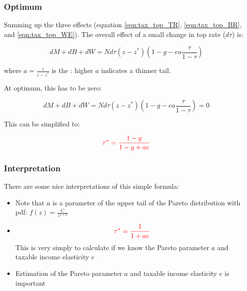         \subsubsection{Optimum}

            Summing up the three effects (equation \ref{eqn:tax_top_TR}, \ref{eqn:tax_top_BR}, and \ref{eqn:tax_top_WE}). The overall effect of a small change in top rate ($d\tau$) is:
    
            \begin{equation*}
                dM + dB + dW = Nd\tau (z-z^*) \left( 1-g-ea \frac{\tau}{1-\tau} \right)
            \end{equation*}
    
            where $a= \frac{z}{z-z^*}$ is the : higher $a$ indicates a thinner tail.
    
            At optimum, this has to be zero:
    
            \begin{equation*}
                dM + dB + dW = Nd\tau (z-z^*) \left( 1-g-ea \frac{\tau}{1-\tau} \right) = 0
            \end{equation*}
    
            This can be simplified to:
    
            \begin{equation}
                \color{red}
                \tau^* = \frac{1-g}{1-g+ae}
            \end{equation}

        \subsubsection{Interpretation}

            There are some nice interpretations of this simple formula:
            \begin{itemize}
                \item Note that $a$ is a parameter of the upper tail of the Pareto distribution with pdf: $f(z)=\frac{C}{z^{1+a}}$
                \item {}
                \begin{equation}
                \color{red}
                    \tau^* = \frac{1}{1+ae}
                \end{equation}
                This is very simply to calculate if we know the Pareto parameter $a$ and taxable income elasticity $e$
                \item Estimation of the Pareto parameter $a$ and taxable income elasticity $e$ is important
            \end{itemize}

